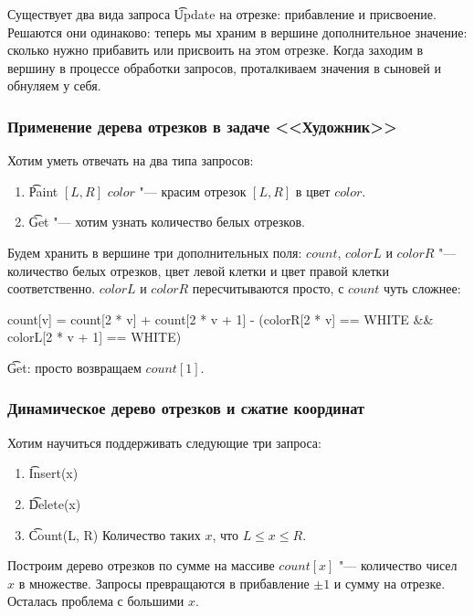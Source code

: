 Существует два вида запроса \t{Update} на отрезке: прибавление и присвоение.
Решаются они одинаково: теперь мы храним в вершине дополнительное значение: сколько нужно прибавить или присвоить на этом отрезке.
Когда заходим в вершину в процессе обработки запросов, проталкиваем значения в сыновей и обнуляем у себя.

\subsubsection{Применение дерева отрезков в задаче <<Художник>>}

Хотим уметь отвечать на два типа запросов:

\begin{enumerate}
	\item \t{Paint} $[L, R]$ $color$ "--- красим отрезок $[L, R]$ в цвет $color$.
	\item \t{Get} "--- хотим узнать количество белых отрезков.
\end{enumerate}

Будем хранить в вершине три дополнительных поля: $count$, $colorL$ и $colorR$ "--- количество белых отрезков, цвет левой клетки и цвет правой клетки соответственно.
$colorL$ и $colorR$ пересчитываются просто, с $count$ чуть сложнее:
\begin{cppcode}
count[v] = count[2 * v] + count[2 * v + 1]
	- (colorR[2 * v] == WHITE && colorL[2 * v + 1] == WHITE)
\end{cppcode}

\t{Get}: просто возвращаем $count[1]$.

\subsubsection{Динамическое дерево отрезков и сжатие координат}

Хотим научиться поддерживать следующие три запроса:
\begin{enumerate}
	\item \t{Insert(x)}
	\item \t{Delete(x)}
	\item \t{Count(L, R)} Количество таких $x$, что $L \le x \le R$.
\end{enumerate}

Построим дерево отрезков по сумме на массиве $count[x]$ "--- количество чисел $x$ в множестве.
Запросы превращаются в прибавление $\pm 1$ и сумму на отрезке.
Осталась проблема с большими $x$.

